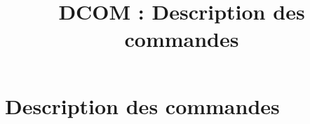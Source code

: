 

\title{DCOM : Description des commandes}


\setcounter{tocdepth}{1}
\maketitle
\tableofcontents
\newpage

\part{Description des commandes}

\newpage


